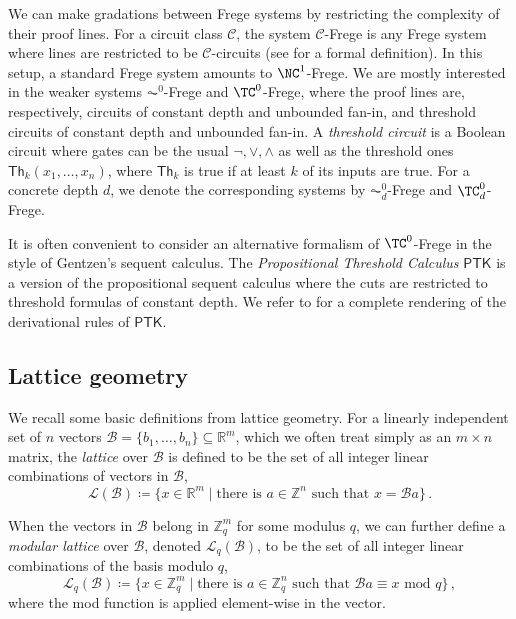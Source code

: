 \documentclass[11pt]{article}
\theoremstyle{definition}
\theoremstyle{plain}
\theoremstyle{remark}
\begin{document}
We can make gradations between Frege systems by restricting the complexity of their proof lines. For a circuit class $\mathcal{C}$, the system $\mathcal{C}$-Frege is any Frege system where lines are restricted to be $\mathcal{C}$-circuits (see \cite{jerabek2005} for a formal definition). In this setup, a standard Frege system amounts to $\NC^1$-Frege. We are mostly interested in the weaker systems $\AC^0$-Frege and $\TC^0$-Frege, where the proof lines are, respectively, circuits of constant depth and unbounded fan-in, and threshold circuits of constant depth and unbounded fan-in. A \emph{threshold circuit} is a Boolean circuit where gates can be the usual $\neg, \vee, \wedge$ as well as the threshold ones $\mathsf{Th}_k(x_1,\dots, x_n)$, where $\mathsf{Th}_k$ is true if at least $k$ of its inputs are true. For a concrete depth $d$, we denote the corresponding systems by $\AC^0_d$-Frege and $\TC^0_d$-Frege.

It is often convenient to consider an alternative formalism of $\TC^0$-Frege in the style of Gentzen's sequent calculus. The \emph{Propositional Threshold Calculus} $\mathsf{PTK}$ \cite[Chapter X.4.1]{cookBOOK} is a version of the propositional sequent calculus where the cuts are restricted to threshold formulas of constant depth. We refer to \cite[Section 2]{BPR1997} for a complete rendering of the derivational rules of $\mathsf{PTK}$.
 
\subsection{Lattice geometry}
\label{subsec:lattice-geo}
We recall some basic definitions from lattice geometry. For a linearly independent set of $n$ vectors $\mathcal{B}=\{b_1,\dots, b_n\} \subseteq\mathbb{R}^m$, which we often treat simply as an $m\times n$ matrix, the \emph{lattice} over $\mathcal{B}$ is defined to be the set of all integer linear combinations of vectors in $\mathcal{B}$,
\begin{equation*}
\mathcal{L}(\mathcal{B}) \coloneqq \{x \in\mathbb{R}^m \mid \text{there is } a\in\mathbb{Z}^n \text{ such that } x= \mathcal{B}a\}\,.
\end{equation*}

When the vectors in $\mathcal{B}$ belong in $\mathbb{Z}_q^m$ for some modulus $q$, we can further define a \emph{modular lattice} over $\mathcal{B}$, denoted $\mathcal{L}_q(\mathcal{B})$, to be the set of all integer linear combinations of the basis modulo $q$,
\begin{equation*}
\mathcal{L}_q(\mathcal{B}) \coloneqq \{x \in \mathbb{Z}_q^m \mid \text{there is } a \in \mathbb{Z}_q^{n}\text{ such that }\mathcal{B} a \equiv x \text{ mod } q\}\,,
\end{equation*}
where the mod function is applied element-wise in the vector.
\end{document}
